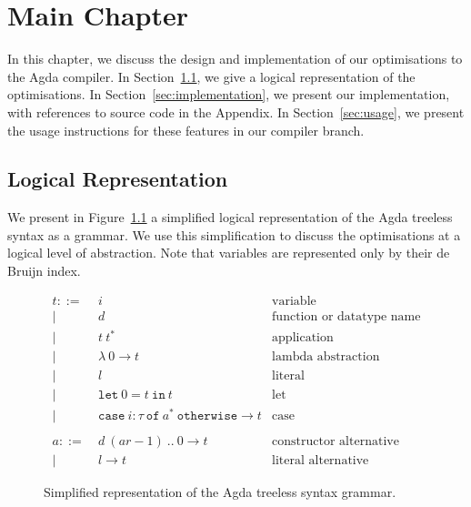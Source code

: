 \chapter{Main Chapter}
\label{cha:main_chapter}

In this chapter, we discuss the design and implementation of our optimisations to the Agda compiler. In Section~\ref{sec:logical_representation}, we give a logical representation of the optimisations. In Section~\ref{sec:implementation}, we present our implementation, with references to source code in the Appendix. In Section~\ref{sec:usage}, we present the usage instructions for these features in our compiler branch.

\section{Logical Representation}
\label{sec:logical_representation}

We present in Figure~\ref{fig:treeless_grammar} a simplified logical representation of the Agda treeless syntax as a grammar. We use this simplification to discuss the optimisations at a logical level of abstraction. Note that variables are represented only by their de Bruijn index.

\begin{figure}[h!]
\begin{align*}
t ::=~& i & \text{variable}\\
|~& d & \text{function or datatype name}\\
|~& t~t^* & \text{application}\\
|~& \lambda~0 \to t & \text{lambda abstraction}\\
|~& l & \text{literal}\\
|~& \mathtt{let}~0 = t~\mathtt{in}~t & \text{let}\\
|~& \mathtt{case}~i : \tau~\mathtt{of}~a^*~\mathtt{otherwise} \to t& \text{case}\\
\\
a ::=~& d~(ar-1)~..~0 \to t & \text{constructor alternative}\\
|~& l \to t & \text{literal alternative}
\end{align*}
\caption{Simplified representation of the Agda treeless syntax grammar.}
\label{fig:treeless_grammar}
\end{figure}


